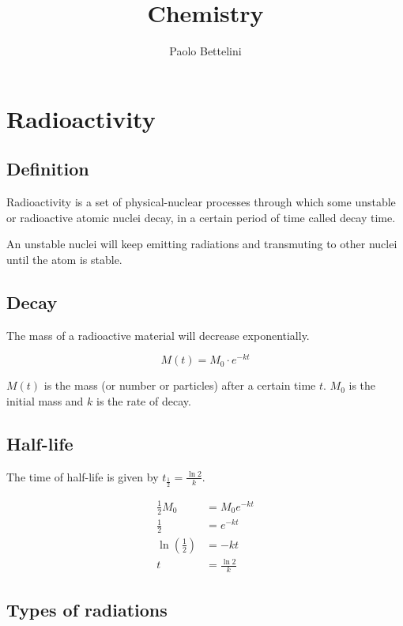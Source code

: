 \documentclass[a4paper]{article}
\title{Chemistry}
\author{Paolo Bettelini}
\date{}
\begin{document}
\maketitle
\tableofcontents

\pagebreak

\section{Radioactivity}

\subsection{Definition}

Radioactivity is a set of physical-nuclear processes
through which some unstable or radioactive atomic nuclei decay,
in a certain period of time called decay time.

An unstable nuclei will keep emitting radiations
and transmuting to other nuclei until the atom is stable.

\subsection{Decay}

The mass of a radioactive material will decrease exponentially.

\[
    M(t) = M_0 \cdot e^{-kt}
\]

\(M(t)\) is the mass (or number or particles)
after a certain time \(t\). \(M_0\) is the initial mass
and \(k\) is the rate of decay.

\subsection{Half-life}

The time of half-life is given by \(t_\frac{1}{2} = \frac{\ln 2}{k}\).

\begin{align*}
    \frac{1}{2}M_0 &= M_0 e^{-kt} \\
    \frac{1}{2} &= e^{-kt} \\
    \ln\left(\frac{1}{2}\right) &= -kt \\
    t &= \frac{\ln 2}{k}
\end{align*}

\subsection{Types of radiations}
\end{document}
